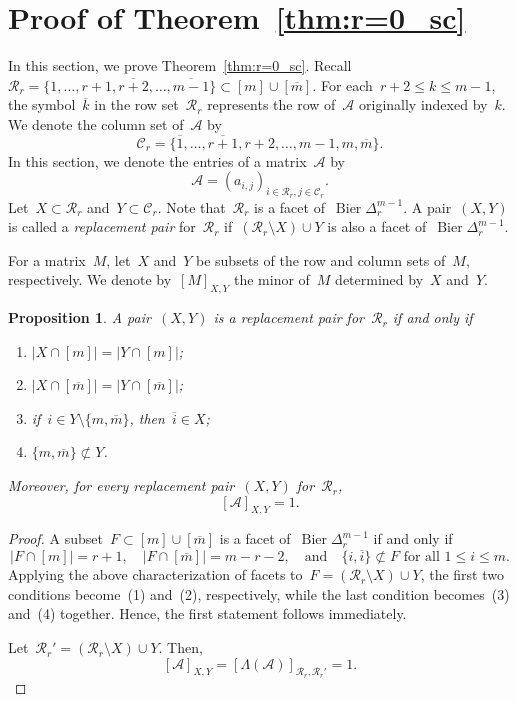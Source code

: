 \documentclass[11pt]{amsart}
\theoremstyle{plain}
\newtheorem{proposition}[theorem]{Proposition}
\numberwithin{equation}{section}
\theoremstyle{definition}
\newcommand{\cC}{\mathcal{C}}
\newcommand{\cR}{\mathcal{R}}
\newcommand{\cA}{\mathcal{A}}
\DeclareMathOperator{\Bier}{Bier}
\begin{document}
\section{Proof of Theorem~\ref{thm:r=0_sc}}\label{sec:proof}

In this section, we prove Theorem~\ref{thm:r=0_sc}.
Recall~$\cR_r= \{1,\ldots,r+1,\overline{r+2},\ldots,\overline{m-1}\} \subset [m] \cup [\overline{m}]$.
For each~$r+2 \leq k \leq m-1$, the symbol~$\overline{k}$ in the row set~$\cR_r$ represents the row of~$\cA$ originally indexed by~$k$.
We denote the column set of~$\cA$ by
$$
    \cC_r= \{\overline{1},\ldots,\overline{r+1},r+2,\ldots,m-1,m,\overline m\}.
$$
In this section, we denote the entries of a matrix~$\cA$ by
$$
    \cA=(a_{i,j})_{i\in\cR_r,  j\in\cC_r}.
$$
Let~$X \subset \cR_r$ and~$Y \subset \cC_r$.
Note that~$\cR_r$ is a facet of~$\Bier \Delta_{r}^{m-1}$.
A pair~$(X,Y)$ is called a \emph{replacement pair} for~$\cR_r$ if~$(\cR_r \setminus X)\cup Y$ is also a facet of~$\Bier \Delta_{r}^{m-1}$.

For a matrix~$M$, let~$X$ and~$Y$ be subsets of the row and column sets of~$M$, respectively.
We denote by~$[M]_{X,Y}$ the minor of~$M$ determined by~$X$ and~$Y$.

\begin{proposition}\label{prop:minor}
    A pair~$(X,Y)$ is a replacement pair for~$\cR_r$ if and only if
    \begin{enumerate}
        \item $|X \cap [m]| = |Y \cap [m]|$;
        \item $|X \cap [\overline{m}]| = |Y \cap [\overline{m}]|$;
        \item if~$i \in Y \setminus \{m,\overline{m}\}$, then~$\overline{i} \in X$;
        \item $\{m,\overline{m}\} \not\subset Y$.
    \end{enumerate}
    Moreover, for every replacement pair~$(X,Y)$ for~$\cR_r$,
    \begin{equation}\label{eq:minor_cal}
        [\cA]_{X,Y}=1.
    \end{equation}
\end{proposition}
\begin{proof}
    A subset~$F \subset [m]\cup[\overline{m}]$ is a facet of~$\Bier\Delta_{r}^{m-1}$ if and only if
    $$
        |F \cap [m]| = r+1,\quad |F \cap [\overline{m}]| = m-r-2,\quad  \text{and} \quad \{i,\overline{i}\}\not\subset F \text{ for all }1 \leq i \leq m.
    $$
    Applying the above characterization of facets to~$F=(\cR_r\setminus X)\cup Y$, the first two conditions become~(1) and~(2), respectively, while the last condition becomes~(3) and~(4) together.
    Hence, the first statement follows immediately.

    Let~$\cR_r' = (\cR_r \setminus X)\cup Y$.
    Then,
    $$
        [\cA]_{X,Y} = [\Lambda(\cA)]_{\cR_r,\cR_r'} = 1.
    $$
\end{proof}
\end{document}
